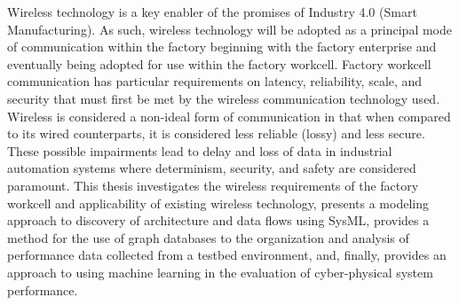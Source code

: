 Wireless technology is a key enabler of the promises of Industry 4.0 (Smart Manufacturing). As such, wireless technology will be adopted as a principal mode of communication within the factory beginning with the factory enterprise and eventually being adopted for use within the factory workcell.  Factory workcell communication has particular requirements on latency, reliability, scale, and security that must first be met by the wireless communication technology used.  Wireless is considered a non-ideal form of communication in that when compared to its wired counterparts, it is considered less reliable (lossy) and less secure.  These possible impairments lead to delay and loss of data in industrial automation systems where determinism, security, and safety are considered paramount.  This thesis investigates the wireless requirements of the factory workcell and applicability of existing wireless technology, presents a modeling approach to discovery of architecture and data flows using SysML, provides a method for the use of graph databases to the organization and analysis of performance data collected from a testbed environment, and, finally, provides an approach to using machine learning in the evaluation of cyber-physical system performance.